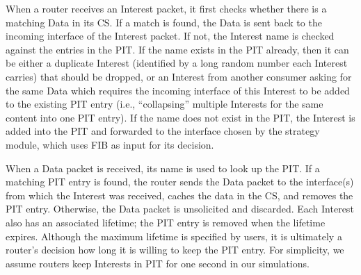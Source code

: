 When a router receives an Interest packet, it first checks whether there is a matching Data in its CS.
If a match is found, the Data is sent back to the incoming interface of the Interest packet.
If not, the Interest name is checked against the entries in the PIT. 
If the name exists in the PIT already, then it can be either a duplicate Interest (identified by a long random number each Interest carries) that should be dropped,
or an Interest from another consumer asking for the same Data which requires the incoming interface of this Interest to be added to the existing PIT entry (i.e., ``collapsing'' multiple Interests for the same content into one PIT entry).
If the name does not exist in the PIT, the Interest is added into the PIT and forwarded to the interface chosen by the strategy module, which uses FIB as input for its decision.

When a Data packet is received, its name is used to look up the PIT.
If a matching PIT entry is found,
the router sends the Data packet to the interface(s) from which the Interest was received, caches the data in the CS, and removes the PIT entry.  Otherwise, the Data packet is unsolicited and discarded. 
Each Interest also has an associated lifetime; the PIT entry is removed when the lifetime expires.
Although the maximum lifetime is specified by users, it is ultimately a router's decision how long it is willing to keep the PIT entry.  
For simplicity, we assume routers keep Interests in PIT for one second in our simulations.






